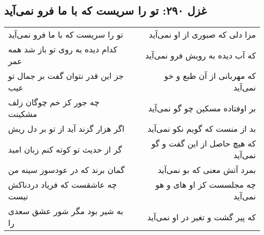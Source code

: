 \begin{center}
\section*{غزل ۲۹۰: تو را سریست که با ما فرو نمی‌آید}
\label{sec:290}
\begin{longtable}{l p{0.5cm} r}
تو را سریست که با ما فرو نمی‌آید
&&
مرا دلی که صبوری از او نمی‌آید
\\
کدام دیده به روی تو باز شد همه عمر
&&
که آب دیده به رویش فرو نمی‌آید
\\
جز این قدر نتوان گفت بر جمال تو عیب
&&
که مهربانی از آن طبع و خو نمی‌آید
\\
چه جور کز خم چوگان زلف مشکینت
&&
بر اوفتاده مسکین چو گو نمی‌آید
\\
اگر هزار گزند آید از تو بر دل ریش
&&
بد از منست که گویم نکو نمی‌آید
\\
گر از حدیث تو کوته کنم زبان امید
&&
که هیچ حاصل از این گفت و گو نمی‌آید
\\
گمان برند که در عودسوز سینه من
&&
بمرد آتش معنی که بو نمی‌آید
\\
چه عاشقست که فریاد دردناکش نیست
&&
چه مجلسست کز او های و هو نمی‌آید
\\
به شیر بود مگر شور عشق سعدی را
&&
که پیر گشت و تغیر در او نمی‌آید
\\
\end{longtable}
\end{center}
